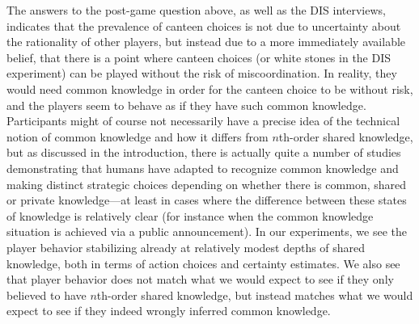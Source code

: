 The answers to the post-game question above, as well as the DIS interviews, indicates that the prevalence of canteen choices is not due to uncertainty about the rationality of other players, but instead due to a more immediately available belief, that there is a point where canteen choices (or white stones in the DIS experiment) can be played without the risk of miscoordination. In reality, they would need common knowledge in order for the canteen choice to be without risk, and the players seem to behave as if they have such common knowledge. 
Participants might of course not necessarily have a precise idea of the technical notion of common knowledge and how it differs from $n$th-order shared knowledge, but as discussed in the introduction, there is actually quite a number of studies demonstrating that humans have adapted to recognize common knowledge and making distinct strategic choices depending on whether there is common, shared or private knowledge---at least in cases where the difference between these states of knowledge is relatively clear (for instance when the common knowledge situation is achieved via a public announcement). In our experiments, we see the player behavior stabilizing already at relatively modest depths of shared knowledge, both in terms of action choices and certainty estimates. We also see that player behavior does not match what we would expect to see if they only believed to have $n$th-order shared knowledge, but instead matches what we would expect to see if they indeed wrongly inferred common knowledge. 


